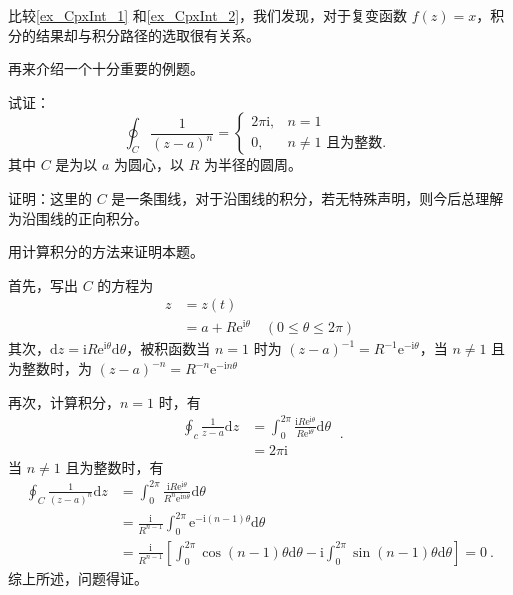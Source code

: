 比较\autoref{ex_CpxInt_1} 和\autoref{ex_CpxInt_2}，我们发现，对于复变函数 $f(z)=x$，积分的结果却与积分路径的选取很有关系。

再来介绍一个十分重要的例题。

\begin{example}{}
试证：
\begin{equation}
\oint_{C} \frac{1}{(z-a)^{n}}=\left\{\begin{array}{ll}2 \pi \mathrm{i}, & n=1 \\ 0, & n \neq 1 \text { 且为整数. }\end{array}\right.
\end{equation}
其中 $C$ 是为以 $a $ 为圆心，以 $R $ 为半径的圆周。

证明：这里的 $C $ 是一条围线，对于沿围线的积分，若无特殊声明，则今后总理解为沿围线的正向积分。

用计算积分的方法来证明本题。

首先，写出 $C $ 的方程为
\begin{equation}
\begin{aligned} z &=z(t) \\ &=a+R \mathrm{e}^{\mathrm{i} \theta} \quad(0 \leqslant \theta \leqslant 2 \pi) \end{aligned}
\end{equation}
其次，$\mathrm{d} z=\mathrm{i} R \mathrm{e}^{\mathrm{i} \theta} \mathrm{d} \theta$，被积函数当 $n =1$ 时为 $(z-a)^{-1}=R^{-1} \mathrm{e}^{-\mathrm{i} \theta}$，当 $n \ne 1$ 且为整数时，为 $(z-a)^{-n}=R^{-n} \mathrm{e}^{-\mathrm{i} n \theta}$

再次，计算积分，$n=1$ 时，有
\begin{equation}
\begin{aligned} \oint_{c} \frac{1}{z-a} \mathrm{d} z &=\int_{0}^{2 \pi} \frac{\mathrm{i} R \mathrm{e}^{\mathrm{i} \theta}}{R \mathrm{e}^{\mathrm{i} \theta}} \mathrm{d} \theta \\ &=2 \pi \mathrm{i} \end{aligned}~.
\end{equation}
当 $n \neq 1$ 且为整数时，有
\begin{equation}
\begin{aligned} \oint_{C} \frac{1}{(z-a)^{n}} \mathrm{d} z &=\int_{0}^{2 \pi} \frac{\mathrm{i} R \mathrm{e}^{\mathrm{i} \theta}}{R^{n} \mathrm{e}^{\mathrm{i} n \theta}} \mathrm{d} \theta \\ &=\frac{\mathrm{i}}{R^{n-1}} \int_{0}^{2 \pi} \mathrm{e}^{-\mathrm{i}(n-1) \theta} \mathrm{d} \theta \\ &=\frac{\mathrm{i}}{R^{n-1}}\left[\int_{0}^{2 \pi} \cos (n-1) \theta \mathrm{d} \theta-\mathrm{i} \int_{0}^{2 \pi} \sin (n-1) \theta \mathrm{d} \theta\right]=0~. \end{aligned}
\end{equation}
综上所述，问题得证。
\end{example}

